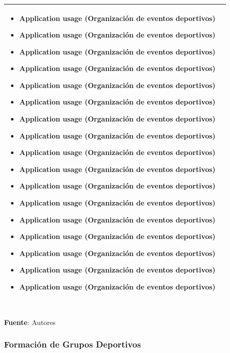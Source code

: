 \begin{table}[!htb]
\begin{center}
{\begin{tabular}{|p{7cm}|p{4cm}|}
\begin{itemize}
				\item Application usage (Organización de eventos deportivos)
				\item Application usage (Organización de eventos deportivos)
				\item Application usage (Organización de eventos deportivos)
				\item Application usage (Organización de eventos deportivos)
				\item Application usage (Organización de eventos deportivos)
				\item Application usage (Organización de eventos deportivos)
				\item Application usage (Organización de eventos deportivos)
				\item Application usage (Organización de eventos deportivos)
				\item Application usage (Organización de eventos deportivos)
				\item Application usage (Organización de eventos deportivos)
				\item Application usage (Organización de eventos deportivos)
				\item Application usage (Organización de eventos deportivos)
				\item Application usage (Organización de eventos deportivos)
				\item Application usage (Organización de eventos deportivos)
				\item Application usage (Organización de eventos deportivos)
				\item Application usage (Organización de eventos deportivos)
				\item Application usage (Organización de eventos deportivos)
			\end{itemize} 
			\\
			\hline
		\end{tabular}
		} \\
		\textbf{Fuente}: Autores
	\end{center}
\end{table}

\subsubsection{Formación de Grupos Deportivos}

